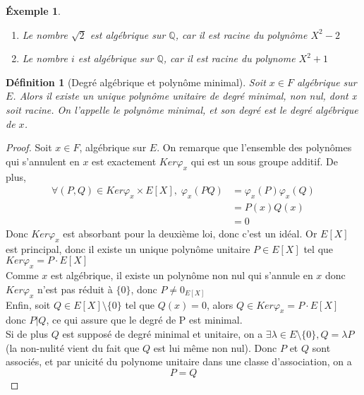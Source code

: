 \documentclass[a4paper,12pt,french,draft]{report}
\newtheorem{definition}{Définition}[section]
\newtheorem{exemple}{Éxemple}[section]
\begin{document}
			\begin{exemple}
			$ $
			    \begin{enumerate} 
				    \item Le nombre \(\sqrt{2}\) est algébrique sur $\mathbb{Q}$, car il est racine du polynôme \(X^{2} - 2\)
				    \item Le nombre $i$ est algébrique sur $\mathbb{Q}$, car il est racine du polynome \(X^{2} +1\)
			    \end{enumerate}
			\end{exemple}
			\begin{definition}[Degré algébrique et polynôme minimal]
				Soit \(x \in F \) algébrique sur \(E\). Alors il existe un unique polynôme unitaire de degré minimal, non nul, dont x soit racine. On l'appelle le \emph{polynôme minimal}, et son degré est le \emph{degré algébrique} de \(x\).{}
			\end{definition}
				\begin{proof}
					Soit \(x \in F\), algébrique sur \(E\). On remarque que l'ensemble des polynômes qui s'annulent en \(x\) est exactement \(Ker \varphi_{x}\) qui est un sous groupe additif. De plus, 
					\[
						\begin{aligned}
							\forall (P,Q) \in Ker\varphi_{x} \times E[X], \; \varphi_{x}(PQ) &= \varphi_{x}(P)\varphi_{x}(Q) \\
											&=P(x)Q(x) \\
											&= 0
						\end{aligned}
					\]
					Donc \(Ker \varphi_{x}\) est absorbant pour la deuxième loi, donc c'est un idéal. Or \(E[X]\) est principal, donc il existe un unique polynôme unitaire \(P \in E[X]\) tel que \(Ker \varphi_{x} = P \cdot E[X]\)\\
					Comme \(x\) est algébrique, il existe un polynôme non nul qui s'annule en \(x\) donc \(Ker \varphi_{x}\) n'est pas réduit à \(\{0\}\), donc \(P \neq 0_{E[X]}\) \\
					Enfin, soit \(Q \in E[X]\setminus\{0\}\) tel que \( Q(x) = 0 \), alors \(Q \in Ker \varphi_{x} = P \cdot E[X] \) donc \(P | Q\), ce qui assure que le degré de P est minimal.\\
					Si de plus \(Q\) est supposé de degré minimal et unitaire, on a \(\exists \lambda \in E\setminus\{0\} , Q = \lambda P \) (la non-nulité vient du fait que \(Q\) est lui même non nul). Donc \(P\) et \(Q\) sont associés, et par unicité du polynome unitaire dans une classe d'association, on a \[P = Q\] 
				\end{proof}
			
\end{document}
